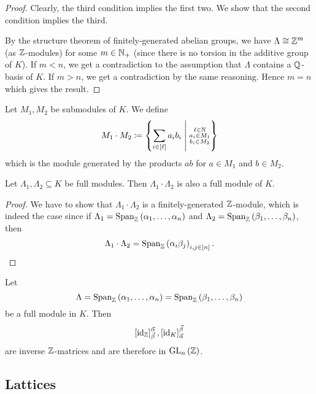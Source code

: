 \documentclass[11pt]{article}
\begin{document}
\begin{proof}
Clearly, the third condition implies the first two. We show that the second condition implies the third.

By the structure theorem of finitely-generated abelian groups, we have $\Lambda \cong \mathbb{Z}^m$ (as $\mathbb{Z}$-modules) for some $m \in \mathbb{N}_+$ (since there is no torsion in the additive group of $K$).
If $m < n$, we get a contradiction to the assumption that $\Lambda$ contains a $\mathbb{Q}$-basis of $K$.
If $m > n$, we get a contradiction by the same reasoning.
Hence $m = n$ which gives the result.
\end{proof}

\begin{definition}
Let $M_1, M_2$ be submodules of $K$. We define
\[M_1 \cdot M_2 \coloneqq \set{\sum_{i \in \brs{\ell}} a_i b_i}{\substack{\ell \in \mbb{N} \\ a_i \in M_1 \\ b_i \in M_2}}\]
which is the module generated by the products $a b$ for $a \in M_1$ and $b \in M_2$.
\end{definition}

\begin{proposition}
Let $\Lambda_1, \Lambda_2 \subseteq K$ be full modules. Then $\Lambda_1 \cdot \Lambda_2$ is also a full module of $K$.
\end{proposition}

\begin{proof}
We have to show that $\Lambda_1 \cdot \Lambda_2$ is a finitely-generated $\mathbb{Z}$-module, which is indeed the case since if $\Lambda_1 = \operatorname{Span}_{\mathbb{Z}}\left( \alpha_1, \ldots, \alpha_n \right)$ and $\Lambda_2 = \operatorname{Span}_{\mathbb{Z}}\left( \beta_1, \ldots, \beta_n \right)$, then
\[\Lambda_1 \cdot \Lambda_2 = \operatorname{Span}_{\mathbb{Z}}\left( \alpha_i \beta_j \right)_{i,j \in [n]} \text{.}\]
\end{proof}

\begin{proposition}
Let \[\Lambda = \operatorname{Span}_{\mathbb{Z}}\left( \alpha_1, \ldots, \alpha_n \right) = \operatorname{Span}_{\mathbb{Z}}\left( \beta_1, \ldots, \beta_n \right)\] be a full module in $K$. Then
\[\left[ \mathrm{id}_{\mathbb{Z}} \right]^{\vec{\alpha}}_{\vec{\beta}}, \left[ \mathrm{id}_K \right]^{\vec{\beta}}_{\vec{\alpha}}\]
are inverse $\mathbb{Z}$-matrices and are therefore in $\mathrm{GL}_n\left( \mathbb{Z} \right)$.
\end{proposition}

\subsection{Lattices}
\end{document}
